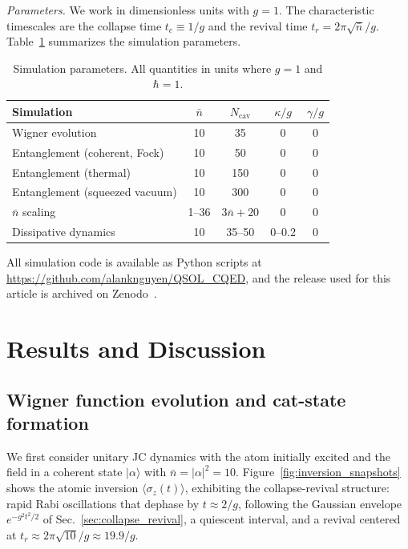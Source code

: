 \documentclass{iopjournal}
\begin{document}
\textit{Parameters.} We work in dimensionless units with $g = 1$. The characteristic timescales are the collapse time $t_c \equiv 1/g$ and the revival time $t_r = 2\pi\sqrt{\bar{n}}/g$. Table~\ref{tab:params} summarizes the simulation parameters.

\begin{table}
\centering
\caption{Simulation parameters. All quantities in units where $g = 1$ and $\hbar = 1$.}
\begin{tabular}{lcccc}
\hline
Simulation & $\bar{n}$ & $N_{\text{cav}}$ & $\kappa/g$ & $\gamma/g$ \\
\hline
Wigner evolution & 10 & 35 & 0 & 0 \\
Entanglement (coherent, Fock) & 10 & 50 & 0 & 0 \\
Entanglement (thermal) & 10 & 150 & 0 & 0 \\
Entanglement (squeezed vacuum) & 10 & 300 & 0 & 0 \\
$\bar{n}$ scaling & 1--36 & $3\bar{n}+20$ & 0 & 0 \\
Dissipative dynamics & 10 & 35--50 & 0--0.2 & 0 \\
\hline
\end{tabular}
\label{tab:params}
\end{table}

All simulation code is available as Python scripts at \url{https://github.com/alanknguyen/QSOL_CQED}, and the release used for this article is archived on Zenodo~\cite{nguyen2026code}.


\section{Results and Discussion}
\label{sec:results}

\subsection{Wigner function evolution and cat-state formation}
\label{sec:wigner_results}

We first consider unitary JC dynamics with the atom initially excited and the field in a coherent state $|\alpha\rangle$ with $\bar{n} = |\alpha|^2 = 10$. Figure~\ref{fig:inversion_snapshots} shows the atomic inversion $\langle\sigma_z(t)\rangle$, exhibiting the collapse-revival structure: rapid Rabi oscillations that dephase by $t \approx 2/g$, following the Gaussian envelope $e^{-g^2t^2/2}$ of Sec.~\ref{sec:collapse_revival}, a quiescent interval, and a revival centered at $t_r \approx 2\pi\sqrt{10}/g \approx 19.9/g$.
\end{document}
